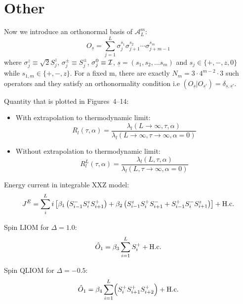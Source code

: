 \section{Other}

Now we introduce an orthonormal basis of \({\mathcal{A}_L^m}\):
\begin{equation}
  O_{\underline{s} } = \sum_{j = 1}^L \sigma_{j}^{s_1}\sigma_{j+1}^{s_2}\cdots \sigma_{j+m-1}^{s_m}
\end{equation}
where \(\sigma^z_j \equiv \sqrt{2}S^{z}_j\), \(\sigma^{\pm}_j \equiv S^{\pm}_j\), \(\sigma^0_j\equiv \mathcal{I} \), \(\underline{s} = (s_1,s_2,\ldots s_m)\)
and \(s_j \in \{+,-,z,0\} \) while \(s_{1,m} \in \{+,-,z\} \). For a fixed m, there are exactly \(N_m = 3\cdot 4^{m-2}\cdot 3\) such operators and they
satisfy an orthonormality condition i.e \(\left(O_{\underline{s}}|O_{\underline{s'}}\right) = \delta_{\underline{s},\underline{s'}}\).

\noindent Quantity that is plotted in Figures~4--14:
\begin{itemize}
    \item 
    With extrapolation to thermodynamic limit:
    \begin{equation}
        R_l(\tau,\alpha) = \frac{\lambda_l(L\rightarrow \infty,\tau,\alpha)}
        {\lambda_l(L\rightarrow \infty,\tau \rightarrow \infty,\alpha=0)}
        \label{eq:R1 extrap}
    \end{equation}
    \item
    Without extrapolation to thermodynamic limit:
    \begin{equation}
        R^L_l(\tau,\alpha) = \frac{\lambda_l(L,\tau,\alpha)}
        {\lambda_l(L,\tau \rightarrow \infty,\alpha=0)}
        \label{eq:R1 no extrap}
    \end{equation}
\end{itemize}


\noindent Energy current in integrable XXZ model: 
\begin{align}
    J^E = \sum_i^L i\left[\beta_1 \left(S^{-}_{i-1}S^{z}_{i}S^{+}_{i+1}\right) + \beta_2 \left(S^{z}_{i-1}S^{+}_{i}S^{-}_{i+1}+S^{+}_{i-1}S^{-}_{i}S^{z}_{i+1}\right)\right] + \text{H.c.}
\end{align}


\noindent Spin LIOM for \(\Delta=1.0\):
\begin{equation}
    \hat{O}_{1} =  \beta_3\sum_{i=1}^{L} S^{+}_{i} + \text{H.c.}
\end{equation}

\noindent Spin QLIOM for \(\Delta=-0.5\):
\begin{equation}
    \hat{O}_{1} =\beta_4 \sum_{i=1}^{L} \Bigl( S^{+}_{i}S^{+}_{i+1}S^{+}_{i+2}\Bigr) + \text{H.c.}
\end{equation}

